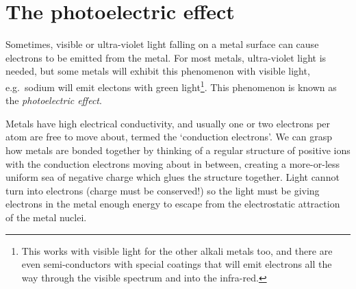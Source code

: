 \section{The photoelectric effect}

Sometimes, visible or ultra-violet light falling on a metal surface can cause electrons to be emitted from the metal.  For most metals, ultra-violet light is needed, but some metals will exhibit this phenomenon with visible light, e.g.\ sodium will emit electons with green light\footnote{This works with visible light for the other alkali metals too, and there are even semi-conductors with special coatings that will emit electrons all the way through the visible spectrum and into the infra-red.}.  This phenomenon is known as the \emph{photoelectric effect}.

Metals have high electrical conductivity, and usually one or two electrons per atom are free to move about, termed the `conduction electrons'. We can grasp how metals are bonded together by thinking of a regular structure of positive ions with the conduction electrons moving about in between, creating a more-or-less uniform sea of negative charge which glues the structure together.  Light cannot turn into electrons (charge must be conserved!) so the light must be giving electrons in the metal enough energy to escape from the electrostatic attraction of the metal nuclei.

\begin{center}
\end{center}


